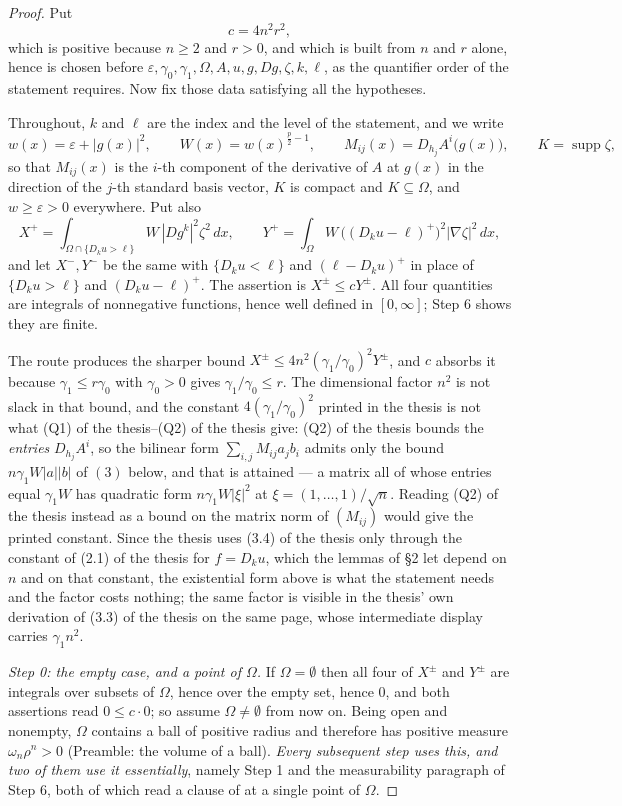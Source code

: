 \begin{proof}
Put
\[
c=4n^2r^2 ,
\]
which is positive because $n\ge2$ and $r>0$, and which is built from $n$ and $r$
alone, hence is chosen before
$\varepsilon,\gamma_0,\gamma_1,\Omega,A,u,g,Dg,\zeta,k,\ell$, as the quantifier
order of the statement requires.  Now fix those data satisfying all the
hypotheses.

Throughout, $k$ and $\ell$ are the index and the level of the statement, and we
write
\[
w(x)=\varepsilon+|g(x)|^2,\qquad
W(x)=w(x)^{\frac p2-1},\qquad
M_{ij}(x)=D_{h_j}A^i\bigl(g(x)\bigr),\qquad
K=\operatorname{supp}\zeta ,
\]
so that $M_{ij}(x)$ is the $i$-th component of the derivative of $A$ at $g(x)$
in the direction of the $j$-th standard basis vector, $K$ is compact and
$K\subseteq\Omega$, and $w\ge\varepsilon>0$ everywhere.  Put also
\[
X^{+}=\int_{\Omega\cap\{D_ku>\ell\}}W\,|Dg^k|^2\zeta^2\,dx,
\qquad
Y^{+}=\int_\Omega W\,\bigl((D_ku-\ell)^{+}\bigr)^2|\nabla\zeta|^2\,dx,
\]
and let $X^{-},Y^{-}$ be the same with $\{D_ku<\ell\}$ and $(\ell-D_ku)^{+}$ in
place of $\{D_ku>\ell\}$ and $(D_ku-\ell)^{+}$.  The assertion is
$X^{\pm}\le cY^{\pm}$.  All four quantities are integrals of nonnegative
functions, hence well defined in $[0,\infty]$; Step 6 shows they are finite.

The route produces the sharper bound
$X^{\pm}\le4n^2(\gamma_1/\gamma_0)^2Y^{\pm}$, and $c$ absorbs it because
$\gamma_1\le r\gamma_0$ with $\gamma_0>0$ gives $\gamma_1/\gamma_0\le r$.  The
dimensional factor $n^2$ is not slack in that bound, and the constant
$4(\gamma_1/\gamma_0)^2$ printed in the thesis is not what
(Q1) of the thesis--(Q2) of the thesis give: (Q2) of the thesis bounds the \emph{entries}
$D_{h_j}A^i$, so the bilinear form $\sum_{i,j}M_{ij}a_jb_i$ admits only the
bound $n\gamma_1W|a||b|$ of $(3)$ below, and that is attained --- a matrix all
of whose entries equal $\gamma_1W$ has quadratic form $n\gamma_1W|\xi|^2$ at
$\xi=(1,\dots,1)/\sqrt n$.  Reading (Q2) of the thesis instead as a bound on the
matrix norm of $(M_{ij})$ would give the printed constant.  Since the thesis
uses (3.4) of the thesis only through the constant of (2.1) of the thesis for $f=D_ku$,
which the lemmas of \S2 let depend on $n$ and on that constant, the existential
form above is what the statement needs and the factor costs nothing; the same
factor is visible in the thesis' own derivation of (3.3) of the thesis on the same
page, whose intermediate display carries $\gamma_1n^2$.

\emph{Step 0: the empty case, and a point of $\Omega$.}  If
$\Omega=\emptyset$ then all four of $X^{\pm}$ and $Y^{\pm}$ are integrals over
subsets of $\Omega$, hence over the empty set, hence $0$, and both assertions
read $0\le c\cdot0$; so assume $\Omega\ne\emptyset$ from now on.  Being open and
nonempty, $\Omega$ contains a ball of positive radius and therefore has positive
measure $\omega_n\rho^n>0$ (Preamble: the volume of a ball).  \emph{Every
subsequent step uses this, and two of them use it essentially}, namely Step 1 and
the measurability paragraph of Step 6, both of which read a clause of
 at a single point of $\Omega$.


\end{proof}

